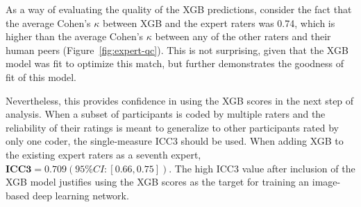 \documentclass[9pt,lineno]{elife}
\begin{document}
As a way of evaluating the quality of the XGB predictions, consider the fact
that the average Cohen's $\kappa$ between XGB and the expert raters was 0.74,
which is higher than the average Cohen's $\kappa$ between any of the other raters
and their human peers (Figure~\ref{fig:expert-qc}). This is not surprising,
given that the XGB model was fit to optimize this match, but further
demonstrates the goodness of fit of this model.

Nevertheless, this provides confidence in using the XGB scores in the next step
of analysis. When a subset of participants is coded by multiple raters and the
reliability of their ratings is meant to generalize to other participants rated by
only one coder, the single-measure ICC3 should be used. When adding XGB to the
existing expert raters as a seventh expert, $\textbf{ICC3} = 0.709 (95\% CI:
[0.66, 0.75])$. The high ICC3 value after inclusion of the XGB model justifies
using the XGB scores as the target for training an image-based deep learning
network.
\end{document}
